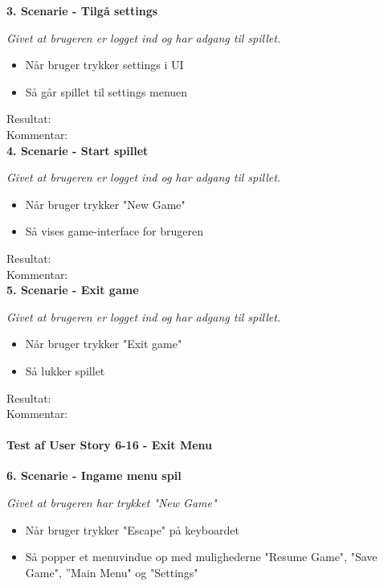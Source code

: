 \textbf{3. Scenarie - Tilgå settings}

\textit{Givet at brugeren er logget ind og har adgang til spillet.}

\begin{itemize}
  \item Når bruger trykker settings i UI
  \item Så går spillet til settings menuen
\end{itemize}

Resultat:\\
Kommentar:\\

\textbf{4. Scenarie - Start spillet}

\textit{Givet at brugeren er logget ind og har adgang til spillet.}

\begin{itemize}
  \item Når bruger trykker "New Game"
  \item Så vises game-interface for brugeren
\end{itemize}

Resultat:\\
Kommentar:\\

\textbf{5. Scenarie - Exit game}

\textit{Givet at brugeren er logget ind og har adgang til spillet.}

\begin{itemize}
  \item Når bruger trykker "Exit game"
  \item Så lukker spillet
\end{itemize}

Resultat:\\
Kommentar:\\

\paragraph{Test af User Story 6-16 - Exit Menu}

\textbf{6. Scenarie - Ingame menu spil}

\textit{Givet at brugeren har trykket "New Game"}

\begin{itemize}
  \item Når bruger trykker "Escape" på keyboardet
  \item Så popper et menuvindue op med mulighederne "Resume Game", "Save Game", ”Main Menu" og "Settings"
\end{itemize}

